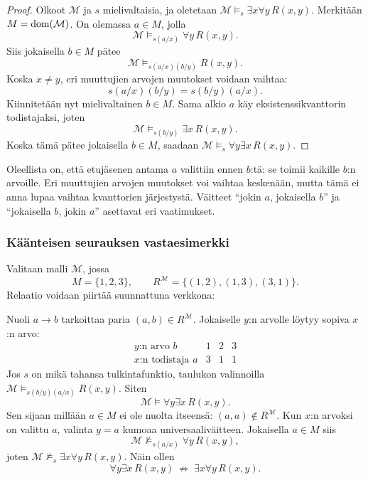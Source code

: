 \documentclass[11pt,a4paper]{amsart}
\begin{document}
\begin{proof}
  Olkoot $\mathcal M$ ja $s$ mielivaltaisia, ja oletetaan
  $\mathcal M\models_s\exists x\forall y\,R(x,y)$.
  Merkitään $M=\operatorname{dom}(\mathcal M)$. On olemassa $a\in M$, jolla
  \[
    \mathcal M\models_{s(a/x)}\forall y\,R(x,y).
  \]
  Siis jokaisella $b\in M$ pätee
  \[
    \mathcal M\models_{s(a/x)(b/y)}R(x,y).
  \]
  Koska $x\ne y$, eri muuttujien arvojen muutokset voidaan vaihtaa:
  \[
    s(a/x)(b/y)=s(b/y)(a/x).
  \]
  Kiinnitetään nyt mielivaltainen $b\in M$. Sama alkio $a$ käy
  eksistenssikvanttorin todistajaksi, joten
  \[
    \mathcal M\models_{s(b/y)}\exists x\,R(x,y).
  \]
  Koska tämä pätee jokaisella $b\in M$, saadaan
  $\mathcal M\models_s\forall y\exists x\,R(x,y)$.
\end{proof}

Oleellista on, että etujäsenen antama $a$ valittiin ennen $b$:tä:
se toimii kaikille $b$:n arvoille. Eri muuttujien arvojen muutokset
voi vaihtaa keskenään, mutta tämä ei anna lupaa vaihtaa kvanttorien
järjestystä. Väitteet ``jokin $a$, jokaisella $b$'' ja
``jokaisella $b$, jokin $a$'' asettavat eri vaatimukset.

\clearpage
\subsubsection{Käänteisen seurauksen vastaesimerkki}

\begin{example}
  Valitaan malli $\mathcal M$, jossa
  \[
    M=\{1,2,3\},\qquad
    R^{\mathcal M}=\{(1,2),(1,3),(3,1)\}.
  \]
  Relaatio voidaan piirtää suunnattuna verkkona:
  \begin{center}
  \end{center}
  Nuoli $a\to b$ tarkoittaa paria $(a,b)\in R^{\mathcal M}$.
  Jokaiselle $y$:n arvolle löytyy sopiva $x$:n arvo:
  \[
    \begin{array}{c|ccc}
      y\text{:n arvo }b & 1 & 2 & 3\\ \hline
      x\text{:n todistaja }a & 3 & 1 & 1
    \end{array}
  \]
  Jos $s$ on mikä tahansa tulkintafunktio, taulukon valinnoilla
  $\mathcal M\models_{s(b/y)(a/x)}R(x,y)$. Siten
  \[
    \mathcal M\models\forall y\exists x\,R(x,y).
  \]
  Sen sijaan millään $a\in M$ ei ole nuolta itseensä:
  $(a,a)\notin R^{\mathcal M}$. Kun $x$:n arvoksi on valittu $a$,
  valinta $y=a$ kumoaa universaaliväitteen. Jokaisella $a\in M$ siis
  \[
    \mathcal M\not\models_{s(a/x)}\forall y\,R(x,y),
  \]
  joten $\mathcal M\not\models_s\exists x\forall y\,R(x,y)$.
  Näin ollen
  \[
    \forall y\exists x\,R(x,y)
    \ \not\Rightarrow\ \exists x\forall y\,R(x,y).
  \]
\end{example}
\end{document}
